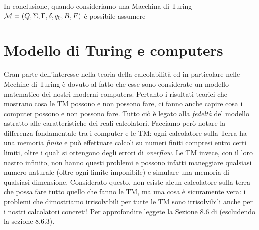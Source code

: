 \documentclass[runningheads,a4paper]{llncs}
\begin{document}
In conclusione, quando consideriamo una Macchina di Turing $\mathcal{M} = (Q,\Sigma,\Gamma,\delta,q_0,B,F)$ \`{e} possibile assumere 


\section{Modello di Turing e computers}

Gran parte dell'interesse nella teoria della calcolabilit\`{a} ed in particolare nelle Mcchine di Turing \`{e} dovuto al fatto che esse sono considerate un modello matematico dei nostri moderni computers. Pertanto i risultati teorici che mostrano cosa le TM possono e non possono fare, ci fanno anche capire cosa i computer possono e non possono fare. Tutto ci\`{o} \`{e} legato alla \emph{fedelt\`{a}} del modello astratto alle caratteristiche dei reali calcolatori. Facciamo per\`{o} notare la differenza fondamentale tra i computer e le TM: ogni calcolatore sulla Terra ha una memoria \emph{finita} e pu\`{o} effettuare calcoli su numeri finiti compresi entro certi limiti, oltre i quali si ottengono degli errori di \emph{overflow}. Le TM invece, con il loro nastro infinito, non hanno questi problemi e possono infatti maneggiare qualsiasi numero naturale (oltre ogni limite imponibile) e simulare una memoria di qualsiasi dimensione. Considerato questo, non esiste alcun calcolatore sulla terra che possa fare tutto quello che fanno le TM, ma una cosa \`{e} sicuramente vera: i problemi che  dimostriamo irrisolvibili per tutte le TM sono irrisolvibili anche per i nostri calcolatori concreti! Per approfondire leggete la Sezione 8.6 di \cite{HMU} (escludendo la sezione 8.6.3).


\end{document}
